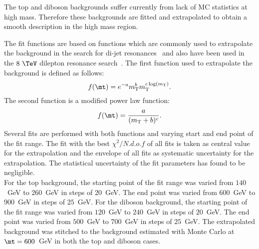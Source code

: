 The top and diboson backgrounds suffer currently from lack of MC statistics at high mass.
Therefore
these backgrounds are fitted and extrapolated to obtain a smooth description in the high mass region.

The fit functions are based on functions which are commonly used to extrapolate the background
 in the search for di-jet resonances~\cite{???} and also have been used in the $8~\TeV$ dilepton resonance search~\cite{???}.
 The first function used to extrapolate the background is defined as follows:
\begin{equation}
 f(\mt) = e^{-a} m_\mathrm{T}^{b} m_\mathrm{T}^{c \log(m_\mathrm{T})}.
  \label{eq:dijetfunc}
\end{equation}
The second function is a modified power law function:
\begin{equation}
 f(\mt) = \frac{a}{(m_\mathrm{T}+b)^{c}}.
  \label{eq:powerlaw}
\end{equation}
Several fits are performed with both functions and varying start and end point of the fit range. The fit with the best $\chi^{2}/N.d.o.f$ of all fits is taken
as central value for the extrapolation and the envelope of all fits as systematic uncertainty for the extrapolation. The statistical uncertainty of the fit parameters
has found to be negligible.\\

For the top background, the
starting point of the fit range was varied from $140$~GeV to $260$~GeV in steps of $20$~GeV. The end point
was varied from $600$~GeV to $900$~GeV in steps of $25$~GeV. For the diboson background,
the starting point of the fit range was varied from $120$~GeV to $240$~GeV in steps of $20$~GeV. The end point
was varied from $500$~GeV to $700$~GeV in steps of $25$~GeV. The extrapolated background was stitched to the background
estimated with Monte Carlo at $\mt=600$~GeV in both the top and diboson cases. 

